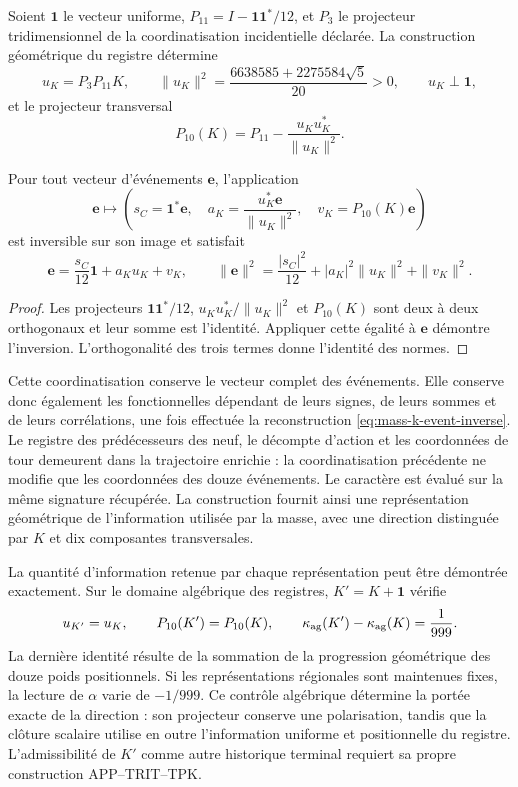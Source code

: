 Soient \(\mathbf1\) le vecteur uniforme, \(P_{11}=I-\mathbf1\mathbf1^*/12\), et \(P_3\) le projecteur tridimensionnel de la coordinatisation incidentielle déclarée. La construction géométrique du registre détermine
\[
 u_K=P_3P_{11}K,\qquad
 \|u_K\|^2=\frac{6638585+2275584\sqrt5}{20}>0,
 \qquad u_K\perp\mathbf1,
\]
et le projecteur transversal
\[
 P_{10}(K)=P_{11}-\frac{u_Ku_K^*}{\|u_K\|^2}.
\]

\begin{proposition}
Pour tout vecteur d'événements \(\mathbf e\), l'application
\begin{equation}
 \mathbf e\longmapsto
 \left(s_C=\mathbf1^*\mathbf e,\quad
       a_K=\frac{u_K^*\mathbf e}{\|u_K\|^2},\quad
       v_K=P_{10}(K)\mathbf e\right)
 \label{eq:mass-k-event-chart}
\end{equation}
est inversible sur son image et satisfait
\begin{equation}
 \mathbf e=\frac{s_C}{12}\mathbf1+a_Ku_K+v_K,
 \qquad
 \|\mathbf e\|^2=\frac{|s_C|^2}{12}
          +|a_K|^2\|u_K\|^2+\|v_K\|^2.
 \label{eq:mass-k-event-inverse}
\end{equation}
\end{proposition}
\begin{proof}
Les projecteurs \(\mathbf1\mathbf1^*/12\), \(u_Ku_K^*/\|u_K\|^2\) et \(P_{10}(K)\) sont deux à deux orthogonaux et leur somme est l'identité. Appliquer cette égalité à \(\mathbf e\) démontre l'inversion. L'orthogonalité des trois termes donne l'identité des normes.
\end{proof}

Cette coordinatisation conserve le vecteur complet des événements. Elle conserve donc également les fonctionnelles dépendant de leurs signes, de leurs sommes et de leurs corrélations, une fois effectuée la reconstruction \eqref{eq:mass-k-event-inverse}. Le registre des prédécesseurs des neuf, le décompte d'action et les coordonnées de tour demeurent dans la trajectoire enrichie : la coordinatisation précédente ne modifie que les coordonnées des douze événements. Le caractère est évalué sur la même signature récupérée. La construction fournit ainsi une représentation géométrique de l'information utilisée par la masse, avec une direction distinguée par \(K\) et dix composantes transversales.

La quantité d'information retenue par chaque représentation peut être démontrée exactement. Sur le domaine algébrique des registres, \(K'=K+\mathbf1\) vérifie
\[
 u_{K'}=u_K,\qquad P_{10}(K')=P_{10}(K),\qquad
 \kappa_{\rm ag}(K')-\kappa_{\rm ag}(K)=\frac1{999}.
\]
La dernière identité résulte de la sommation de la progression géométrique des douze poids positionnels. Si les représentations régionales sont maintenues fixes, la lecture de \(\alpha\) varie de \(-1/999\). Ce contrôle algébrique détermine la portée exacte de la direction : son projecteur conserve une polarisation, tandis que la clôture scalaire utilise en outre l'information uniforme et positionnelle du registre. L'admissibilité de \(K'\) comme autre historique terminal requiert sa propre construction APP--TRIT--TPK.

